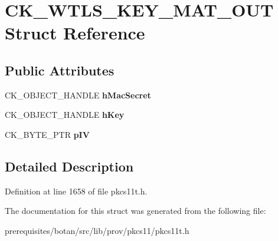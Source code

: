 \hypertarget{struct_c_k___w_t_l_s___k_e_y___m_a_t___o_u_t}{}\section{C\+K\+\_\+\+W\+T\+L\+S\+\_\+\+K\+E\+Y\+\_\+\+M\+A\+T\+\_\+\+O\+UT Struct Reference}
\label{struct_c_k___w_t_l_s___k_e_y___m_a_t___o_u_t}
\subsection*{Public Attributes}
\begin{DoxyCompactItemize}
\item 
\mbox{\label{struct_c_k___w_t_l_s___k_e_y___m_a_t___o_u_t_a00658d76a389d170699973832566b3a3}} 
C\+K\+\_\+\+O\+B\+J\+E\+C\+T\+\_\+\+H\+A\+N\+D\+LE {\bfseries h\+Mac\+Secret}
\item 
\mbox{\label{struct_c_k___w_t_l_s___k_e_y___m_a_t___o_u_t_a75c3f25b467dc7d7d914e858becf5251}} 
C\+K\+\_\+\+O\+B\+J\+E\+C\+T\+\_\+\+H\+A\+N\+D\+LE {\bfseries h\+Key}
\item 
\mbox{\label{struct_c_k___w_t_l_s___k_e_y___m_a_t___o_u_t_a3bd65cceda3c251a13277ac4aef20d07}} 
C\+K\+\_\+\+B\+Y\+T\+E\+\_\+\+P\+TR {\bfseries p\+IV}
\end{DoxyCompactItemize}


\subsection{Detailed Description}


Definition at line 1658 of file pkcs11t.\+h.



The documentation for this struct was generated from the following file\+:\begin{DoxyCompactItemize}
\item 
prerequisites/botan/src/lib/prov/pkcs11/pkcs11t.\+h\end{DoxyCompactItemize}
